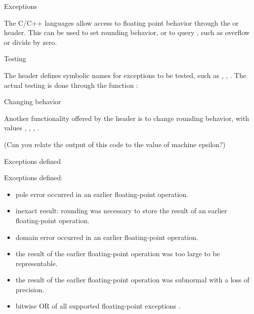 \lstset{language=C}

 {Exceptions}
\label{sec:fenv}

The C/C++ languages allow access to floating point behavior
through the  or  header.
This can be used to set rounding behavior,
or to query
%
,
such as overflow or divide by zero.

 {Testing}

The header defines symbolic names for exceptions to be tested,
such as , , .
The actual testing is done through the function :
%

 {Changing behavior}

Another functionality offered by the header is
to change rounding behavior,
with values , ,
, .


(Can you relate the output of this code to the value of machine epsilon?)


 {Exceptions defined}

Exceptions defined:
\begin{itemize}
\item {} pole error occurred in an earlier
  floating-point operation.
\item {} inexact result: rounding was
  necessary to store the result of an earlier floating-point
  operation.
\item {} domain error occurred in an earlier
  floating-point operation.
\item {} the result of the earlier
  floating-point operation was too large to be representable.
\item {} the result of the earlier
  floating-point operation was subnormal with a loss of precision.
\item {} bitwise OR of all supported
  floating-point exceptions .
\end{itemize}

